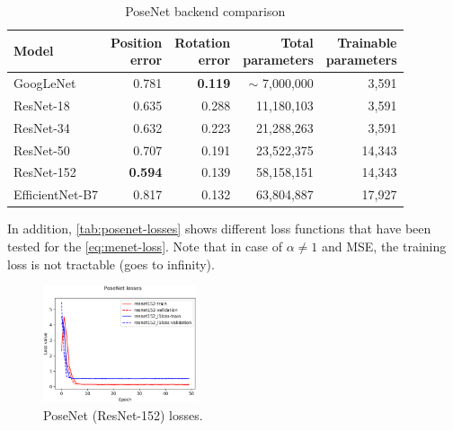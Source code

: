 \begin{table}[htbp]
    \caption{PoseNet backend comparison}
    \begin{center}
        \begin{tabular}{lrrrr}
            \toprule
            {Model}         & \thead{Position                                              \\error} & \thead{Rotation\\error} & \thead{Total\\parameters} & \thead{Trainable\\parameters} \\
            \midrule
            GoogLeNet       & 0.781           & \textbf{0.119} & $\sim$ 7,000,000 & 3,591  \\
            ResNet-18       & 0.635           & 0.288          & 11,180,103       & 3,591  \\
            ResNet-34       & 0.632           & 0.223          & 21,288,263       & 3,591  \\
            ResNet-50       & 0.707           & 0.191          & 23,522,375       & 14,343 \\
            ResNet-152      & \textbf{0.594}  & 0.139          & 58,158,151       & 14,343 \\
            EfficientNet-B7 & 0.817           & 0.132          & 63,804,887       & 17,927 \\
            \bottomrule
        \end{tabular}
        \label{tab:posenet-backends}
    \end{center}
\end{table}

In addition, \cref{tab:posenet-losses} shows different loss functions that have been tested for the \cref{eq:menet-loss}. Note that in case of $\alpha \neq 1$ and MSE, the training loss is not tractable (goes to infinity).
\begin{figure}[htbp]
    \begin{center}
        \includegraphics[width=0.4\textwidth]{./imgs/posenet_losses.png}
    \end{center}
    \caption{PoseNet (ResNet-152) losses.}
    \label{fig:posenet-losses}
\end{figure}

